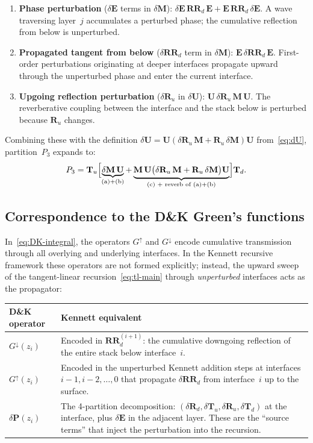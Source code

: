 \documentclass[11pt,a4paper]{article}
\newcommand{\dR}{\delta\mathbf{R}}
\newcommand{\dT}{\delta\mathbf{T}}
\newcommand{\dE}{\delta\mathbf{E}}
\newcommand{\dM}{\delta\mathbf{M}}
\newcommand{\dU}{\delta\mathbf{U}}
\newcommand{\dRR}{\delta\mathbf{RR}}
\newcommand{\RR}{\mathbf{RR}}
\newcommand{\Ru}{\mathbf{R}_u}
\newcommand{\Tu}{\mathbf{T}_u}
\newcommand{\Td}{\mathbf{T}_d}
\newcommand{\vE}{\mathbf{E}}
\newcommand{\vM}{\mathbf{M}}
\newcommand{\vU}{\mathbf{U}}
\theoremstyle{plain}
\theoremstyle{remark}
\begin{document}
\begin{enumerate}[label=(\alph*),nosep]
  \item \textbf{Phase perturbation} ($\dE$ terms in $\dM$):
    $\dE\,\RR_d\,\vE + \vE\,\RR_d\,\dE$.
    A wave traversing layer~$j$ accumulates a perturbed phase; the
    cumulative reflection from below is unperturbed.
  \item \textbf{Propagated tangent from below} ($\dRR_d$ term in $\dM$):
    $\vE\,\dRR_d\,\vE$.
    First-order perturbations originating at deeper interfaces propagate
    upward through the unperturbed phase and enter the current interface.
  \item \textbf{Upgoing reflection perturbation} ($\dR_u$ in $\dU$):
    $\vU\,\dR_u\,\vM\,\vU$.
    The reverberative coupling between the interface and the stack below
    is perturbed because $\Ru$ changes.
\end{enumerate}

\noindent Combining these with the definition $\dU =
\vU(\dR_u\,\vM + \Ru\,\dM)\vU$ from~\eqref{eq:dU}, partition~$P_3$
expands to:
\begin{equation}\label{eq:P3-expand}
  P_3 = \Tu\Bigl[
    \underbrace{\dM\,\vU}_{\text{(a)+(b)}}
    + \underbrace{\vM\,\vU\bigl(\dR_u\,\vM
      + \Ru\,\dM\bigr)\vU}_{\text{(c) + reverb of (a)+(b)}}
  \Bigr]\Td.
\end{equation}

\subsection{Correspondence to the D\&K Green's functions}

In~\eqref{eq:DK-integral}, the operators $G^{\uparrow}$ and
$G^{\downarrow}$ encode cumulative transmission through all overlying
and underlying interfaces.  In the Kennett recursive framework these
operators are not formed explicitly; instead, the upward sweep of the
tangent-linear recursion~\eqref{eq:tl-main} through \emph{unperturbed}
interfaces acts as the propagator:

\begin{center}
\renewcommand{\arraystretch}{1.3}
\begin{tabular}{lp{9cm}}
  \toprule
  \textbf{D\&K operator} & \textbf{Kennett equivalent} \\
  \midrule
  $G^{\downarrow}(z_i)$
    & Encoded in $\RR_d^{(i+1)}$: the cumulative downgoing reflection
      of the entire stack below interface~$i$. \\
  $G^{\uparrow}(z_i)$
    & Encoded in the unperturbed Kennett addition steps at
      interfaces $i{-}1, i{-}2, \dotsc, 0$ that propagate $\dRR_d$
      from interface~$i$ up to the surface. \\
  $\delta\mathbf{P}(z_i)$
    & The 4-partition decomposition: $(\dR_d,\dT_u,\dR_u,\dT_d)$ at the
      interface, plus $\dE$ in the adjacent layer.  These are the
      ``source terms'' that inject the perturbation into the recursion.\\
  \bottomrule
\end{tabular}
\end{center}
\end{document}
